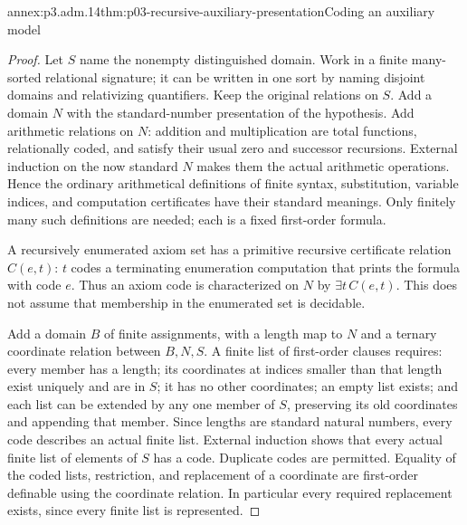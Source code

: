 \begin{annexitem}{annex:p3.adm.14}{thm:p03-recursive-auxiliary-presentation}{Coding an auxiliary model}
\begin{proof}
Let \(S\) name the nonempty distinguished domain. Work in a finite
many-sorted relational signature; it can be written in one sort by
naming disjoint domains and relativizing quantifiers. Keep the original
relations on \(S\). Add a domain \(N\) with the standard-number
presentation of the hypothesis. Add arithmetic relations on \(N\):
addition and multiplication are total functions, relationally coded,
and satisfy their usual zero and successor recursions. External
induction on the now standard \(N\) makes them the actual arithmetic
operations. Hence the ordinary arithmetical definitions of finite
syntax, substitution, variable indices, and computation certificates
have their standard meanings. Only finitely many such definitions are
needed; each is a fixed first-order formula.

A recursively enumerated axiom set has a primitive recursive
certificate relation \(C(e,t)\): \(t\) codes a terminating enumeration
computation that prints the formula with code \(e\). Thus an axiom
code is characterized on \(N\) by \(\exists t\,C(e,t)\). This does
not assume that membership in the enumerated set is decidable.

Add a domain \(B\) of finite assignments, with a length map to \(N\)
and a ternary coordinate relation between \(B,N,S\). A finite list of
first-order clauses requires: every member has a length; its coordinates
at indices smaller than that length exist uniquely and are in \(S\);
it has no other coordinates; an empty list exists; and each list can
be extended by any one member of \(S\), preserving its old coordinates
and appending that member. Since lengths are standard natural numbers,
every code describes an actual finite list. External induction shows
that every actual finite list of elements of \(S\) has a code.
Duplicate codes are permitted. Equality of the coded lists, restriction,
and replacement of a coordinate are first-order definable using the
coordinate relation. In particular every required replacement exists,
since every finite list is represented.


\end{proof}
\end{annexitem}
